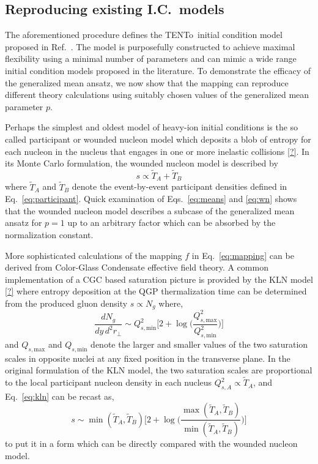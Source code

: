 \documentclass[aps,prc,reprint,amsmath,nofootinbib,superscriptaddress]{revtex4-1}
\newcommand{\trento}{T\raisebox{-0.5ex}{R}ENTo}
\newcommand{\T}{\tilde{T}}
\newcommand{\Qs}[1]{Q_{s,\text{#1}}}
\begin{document}
\subsection{Reproducing existing I.C.\ models}


The aforementioned procedure defines the \trento\ initial condition model proposed in Ref.~\cite{Moreland:2014oya}.
The model is purposefully constructed to achieve maximal flexibility using a minimal number of parameters and can mimic a wide range initial condition models proposed in the literature.
To demonstrate the efficacy of the generalized mean ansatz, we now show that the mapping can reproduce different theory calculations using suitably chosen values of the generalized mean parameter $p$.

Perhaps the simplest and oldest model of heavy-ion initial conditions is the so called participant or wounded nucleon model which deposits a blob of entropy for each nucleon in the nucleus that engages in one or more inelastic collisions \ref{?}.
In its Monte Carlo formulation, the wounded nucleon model is described by
\begin{equation}
  s \propto \T_A + \T_B
  \label{eq:wn}
\end{equation}
where $\T_A$ and $\T_B$ denote the event-by-event participant densities defined in Eq.~\eqref{eq:participant}.
Quick examination of Eqs.~\eqref{eq:means} and \eqref{eq:wn} shows that the wounded nucleon model describes a subcase of the generalized mean ansatz for $p=1$ up to an arbitrary factor which can be absorbed by the normalization constant.

More sophisticated calculations of the mapping $f$ in Eq.~\eqref{eq:mapping} can be derived from Color-Glass Condensate effective field theory.
A common implementation of a CGC based saturation picture is provided by the KLN model \ref{?} where entropy deposition at the QGP thermalization time can be determined from the produced gluon density $s \propto N_g$ where,
\begin{equation}
  \frac{dN_g}{dy\,d^2r_\perp} \sim \Qs{min}^2 \biggl[
    2 + \log \biggl(\frac{\Qs{max}^2}{\Qs{min}^2} \biggr)
  \biggr]
  \label{eq:kln}
\end{equation}
and $\Qs{max}$ and $\Qs{min}$ denote the larger and smaller values of the two saturation scales in opposite nuclei at any fixed position in the transverse plane.
In the original formulation of the KLN model, the two saturation scales are proportional to the local participant nucleon density in each nucleus $Q^2_{s,A} \propto \T_A$, and Eq.~\eqref{eq:kln} can be recast as,
\begin{equation}
  s \sim \min(\T_A, \T_B) \biggl[
    2 + \log \biggl(\frac{\max(\T_A,\T_B)}{\min(\T_A,\T_B)}\biggr)
  \biggr]
\end{equation}
to put it in a form which can be directly compared with the wounded nucleon model.
\end{document}
